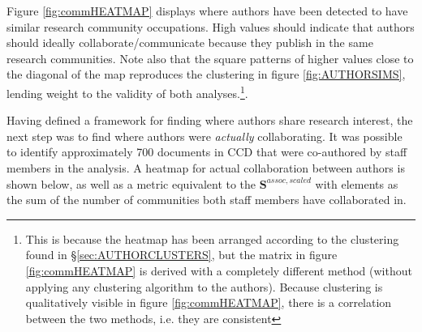 Figure \ref{fig:commHEATMAP} displays where authors have been detected to have similar research community occupations. High values should indicate that authors should ideally collaborate/communicate because they publish in the same research communities. Note also that the square patterns of higher values close to the diagonal of the map reproduces the clustering in figure \ref{fig:AUTHORSIMS}, lending weight to the validity of both analyses.\footnote{This is because the heatmap has been arranged according to the clustering found in \S\ref{sec:AUTHORCLUSTERS}, but the matrix in figure \ref{fig:commHEATMAP} is derived with a completely different method (without applying any clustering algorithm to the authors). Because clustering is qualitatively visible in figure \ref{fig:commHEATMAP}, there is a correlation between the two methods, i.e. they are consistent}.

Having defined a framework for finding where authors share research interest, the next step was to find where authors were \emph{actually} collaborating. It was possible to identify approximately 700 documents in CCD that were co-authored by staff members in the analysis. A heatmap for actual collaboration between authors is shown below, as well as a metric equivalent to the $\mathbf{S}^{assoc,scaled}$ with elements as the sum of the number of communities both staff members have collaborated in.

